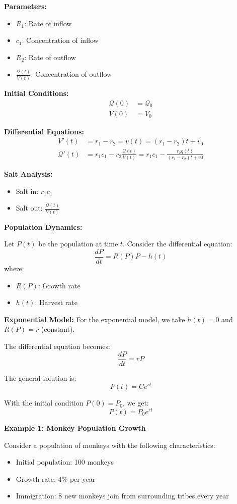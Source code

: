 \documentclass{article}
\begin{document}
\textbf{Parameters:}
\begin{itemize}
    \item $R_1$: Rate of inflow
    \item $c_1$: Concentration of inflow
    \item $R_2$: Rate of outflow
    \item $\frac{\mathcal{Q}(t)}{V(t)}$: Concentration of outflow
\end{itemize}

\textbf{Initial Conditions:}
\begin{align*}
    \mathcal{Q}(0) &= \mathcal{Q}_0 \\
    V(0) &= V_0
\end{align*}

\textbf{Differential Equations:}
\begin{align*}
    V'(t) &= r_1 - r_2  = v(t) = (r_1 - r_2)t + v_0\\
    \mathcal{Q}'(t) &= r_1c_1 - r_2 \frac{\mathcal{Q}(t)}{V(t)} = r_1c_1 - \frac{r_2q(t)}{(r_1-r_2)t+v0}
\end{align*}

\textbf{Salt Analysis:}
\begin{itemize}
    \item Salt in: $r_1c_1$
    \item Salt out: $\frac{\mathcal{Q}(t)}{V(t)}$
\end{itemize}

\textbf{Population Dynamics:}

Let $P(t)$ be the population at time $t$. Consider the differential equation:
\[
    \frac{dP}{dt} = R(P)P - h(t)
\]
where:
\begin{itemize}
    \item $R(P)$: Growth rate
    \item $h(t)$: Harvest rate
\end{itemize}

\textbf{Exponential Model:}
For the exponential model, we take $h(t) = 0$ and $R(P) = r$ (constant).

The differential equation becomes:
\[
    \frac{dP}{dt} = rP
\]

The general solution is:
\[
    P(t) = Ce^{rt}
\]

With the initial condition $P(0) = P_0$, we get:
\[
    P(t) = P_0e^{rt}
\]

\textbf{Example 1: Monkey Population Growth}

Consider a population of monkeys with the following characteristics:
\begin{itemize}
    \item Initial population: 100 monkeys
    \item Growth rate: 4\% per year
    \item Immigration: 8 new monkeys join from surrounding tribes every year
\end{itemize}
\end{document}
